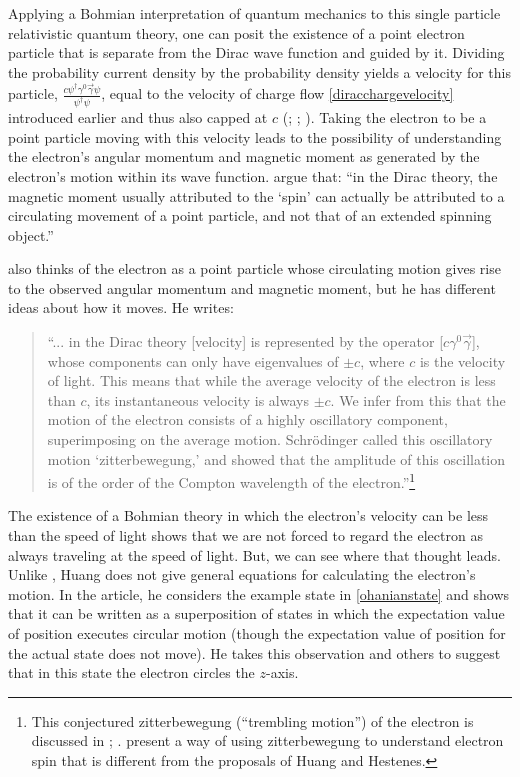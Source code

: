 \documentclass[12pt,secnumarabic,amsmath,amssymb,balancelastpage,nofootinbib]{article}
\begin{document}
Applying a Bohmian interpretation of quantum mechanics to this single particle relativistic quantum theory, one can posit the existence of a point electron particle that is separate from the Dirac wave function and guided by it.  Dividing the probability current density by the probability density yields a velocity for this particle, $\frac{c\psi^\dagger\gamma^{0} \vec{\gamma}\psi}{\psi^\dagger\psi}$, equal to the velocity of charge flow \eqref{diracchargevelocity} introduced earlier and thus also capped at $c$ (\citealp{bohm1953comments}; \citealp[section 10.4]{bohmhiley}; \citealp[equation 12.2.10]{holland}).  Taking the electron to be a point particle moving with this velocity leads to the possibility of understanding the electron's angular momentum and magnetic moment as generated by the electron's motion within its wave function.  \citet[pg.\ 218]{bohmhiley} argue that: ``in the Dirac theory, the magnetic moment usually attributed to the `spin' can actually be attributed to a circulating movement of a point particle, and not that of an extended spinning object.''

\citet{huang1952} also thinks of the electron as a point particle whose circulating motion gives rise to the observed angular momentum and magnetic moment, but he has different ideas about how it moves.  He writes:
\begin{quote}
``... in the Dirac theory [velocity] is represented by the operator [$c\gamma^{0} \vec{\gamma}$], whose components can only have eigenvalues of $\pm c$, where $c$ is the velocity of light.  This means that while the average velocity of the electron is less than $c$, its instantaneous velocity is always $\pm c$.  We infer from this that the motion of the electron consists of a highly oscillatory component, superimposing on the average motion.  Schr\"{o}dinger called this oscillatory motion `zitterbewegung,' and showed that the amplitude of this oscillation is of the order of the Compton wavelength of the electron.''\footnote{This conjectured zitterbewegung (``trembling motion'') of the electron is discussed in \citet[section 69]{dirac}; \citet[pg.\ 38]{bjorkendrell}.  \citet{barutzanghi} present a way of using zitterbewegung to understand electron spin that is different from the proposals of Huang and Hestenes.}
\end{quote}
The existence of a Bohmian theory in which the electron's velocity can be less than the speed of light shows that we are not forced to regard the electron as always traveling at the speed of light.  But, we can see where that thought leads.  Unlike \citet{bohmhiley}, Huang does not give general equations for calculating the electron's motion.  In the article, he considers the example state in \eqref{ohanianstate} and shows that it can be written as a superposition of states in which the expectation value of position executes circular motion (though the expectation value of position for the actual state does not move).  He takes this observation and others to suggest that in this state the electron circles the $z$-axis.
\end{document}
